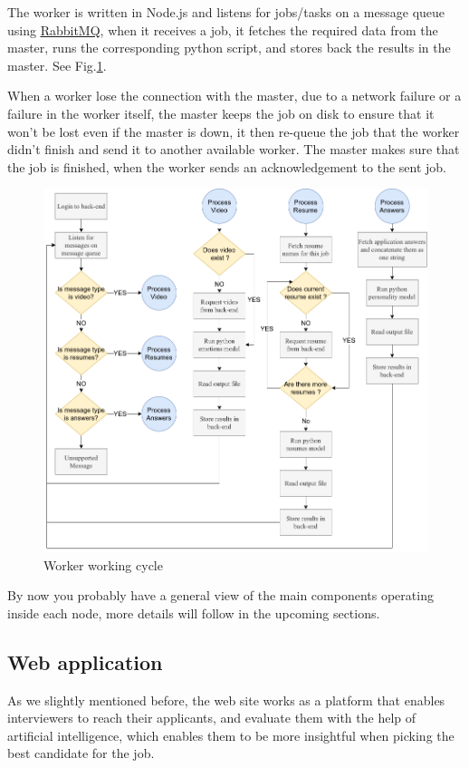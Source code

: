 The worker is written in Node.js and listens for jobs/tasks on a message queue using \href{https://www.rabbitmq.com/}{\underline{RabbitMQ}}, when it receives a job, it fetches the required data from the master, runs the corresponding python script, and stores back the results in the master. See Fig.\ref{fig:worker_flow}.

When a worker lose the connection with the master, due to a network failure or a failure in the worker itself, the master keeps the job on disk to ensure that it won't be lost even if the master is down, it then re-queue the job that the worker didn't finish and send it to another available worker.
The master makes sure that the job is finished, when the worker sends an acknowledgement to the sent job.


\begin{figure}[h]
\centering
\includegraphics[width=\textwidth, frame]{images/worker flow chart.png}
\caption{Worker working cycle}
\label{fig:worker_flow}
\end{figure}

By now you probably have a general view of the main components operating inside each node, more details will follow in the upcoming sections.

\subsection{Web application}
As we slightly mentioned before, the web site works as a platform that enables interviewers to reach their applicants, and evaluate them with the help of artificial intelligence, which enables them to be more insightful when picking the best candidate for the job.

